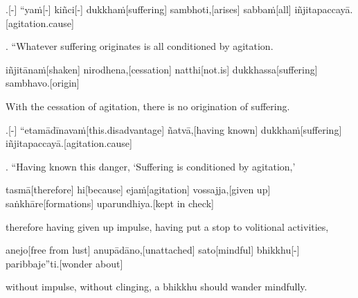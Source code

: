 \vskip 0.2in
\begin{samepage}
.[-] “yaṁ[-] kiñci[-] dukkhaṁ[suffering] sambhoti,[arises] sabbaṁ[all] iñjitapaccayā.[agitation.cause]
\endgl
\nopagebreak
\linespread{0.5}
\begin{spacin}{0.2}
{. “Whatever suffering originates  is all conditioned by agitation.}
\end{spacin}
\vskip 12pt
\end{samepage}
\begin{samepage}
\begingl[glneveryline={\PaliGlossA,\PaliGlossB}]
iñjitānaṁ[shaken] nirodhena,[cessation] natthi[not.is] dukkhassa[suffering] sambhavo.[origin]
\endgl
\nopagebreak
\linespread{0.5}
\begin{spacin}{0.2}
{\PaliGlossFT With the cessation of agitation, there is no origination of suffering.}
\end{spacin}
\vskip 12pt
\end{samepage}
\begin{samepage}
.[-] “etamādīnavaṁ[this.disadvantage] ñatvā,[having known] dukkhaṁ[suffering] iñjitapaccayā.[agitation.cause]
\endgl
\nopagebreak
\linespread{0.5}
\begin{spacin}{0.2}
{. “Having known this danger, ‘Suffering is conditioned by agitation,’}
\end{spacin}
\vskip 12pt
\end{samepage}
\begin{samepage}
\begingl[glneveryline={\PaliGlossA,\PaliGlossB}]
tasmā[therefore] hi[because] ejaṁ[agitation] vossajja,[given up] saṅkhāre[formations] uparundhiya.[kept in check]
\endgl
\nopagebreak
\linespread{0.5}
\begin{spacin}{0.2}
{\PaliGlossFT therefore having given up impulse, having put a stop to volitional activities,}
\end{spacin}
\vskip 12pt
\end{samepage}
\begin{samepage}
\begingl[glneveryline={\PaliGlossA,\PaliGlossB}]
anejo[free from lust] anupādāno,[unattached] sato[mindful] bhikkhu[-] paribbaje”ti.[wonder about]
\endgl
\nopagebreak
\linespread{0.5}
\begin{spacin}{0.2}
{\PaliGlossFT without impulse, without clinging, a bhikkhu should wander mindfully.}
\end{spacin}
\vskip 12pt
\end{samepage}
\vskip 0.2in
